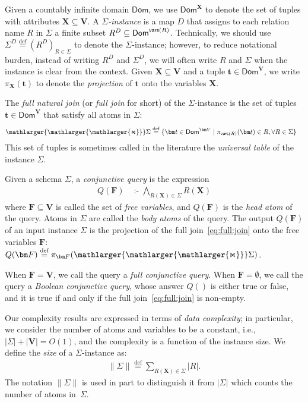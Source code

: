 \documentclass{theoretics}
\newcommand{\norm}[1]{\|#1\|}
\newcommand{\setof}[2]{\{{#1}\mid{#2}\}}        %
\newcommand{\dom}{\textsf{Dom}}
\newcommand{\defeq}{\stackrel{\text{def}}{=}}
\newcommand{\cd}{\text{ :- }}
\newcommand{\bigjoin}{\mathlarger{\mathlarger{\mathlarger{\Join}}}}
\newcommand{\vars}{\text{\sf vars}}
\begin{document}
Given a countably infinite domain $\dom$, we use $\dom^{\bm X}$ to denote the set of tuples
with attributes $\bm X \subseteq \bm V$. A {\em $\Sigma$-instance} is a map $D$ that assigns
to each relation name $R$ in $\Sigma$ a finite subset $R^D \subseteq\dom^{\vars(R)}$.
Technically, we should use $\Sigma^D \defeq (R^D)_{R \in \Sigma}$ to denote the
$\Sigma$-instance; however, to reduce notational burden, instead of writing $R^D$ and
$\Sigma^D$, we will often write $R$ and $\Sigma$ when the instance is clear from the context.
Given $\bm X \subseteq \bm V$ and a tuple $\bm t \in \dom^{\bm V}$, we write $\pi_{\bm
X}(\bm t)$ to denote the {\em projection} of $\bm t$ onto the variables $\bm X$.

The {\em full natural join} (or {\em full join} for short) of the $\Sigma$-instance is the set of tuples
$\bm t \in \dom^{\bm V}$ that satisfy all atoms in $\Sigma$:
%
\begin{align}
  \bigjoin \Sigma & \defeq \setof{\bm t \in \dom^{\bm V}}{
    \pi_{\vars(R)}(\bm t) \in R,
    \forall R \in \Sigma
  }
  \label{eq:full:join}
\end{align}
%
This set of tuples is sometimes called in the literature the {\em universal table} of the
instance $\Sigma$.

Given a schema $\Sigma$,  a {\em conjunctive query} is the expression
%
\begin{align}
    Q(\bm F) &\cd  \bigwedge_{R(\bm X)\in \Sigma} R(\bm X) \label{eq:cq}
\end{align}
where $\bm F \subseteq \bm V$ is called the set of {\em free variables},
and $Q(\bm F)$ is the {\em head atom} of the query.
Atoms in $\Sigma$ are called the {\em body atoms} of the query.
The output $Q(\bm F)$ of an input instance $\Sigma$ is the projection of the
full join~\eqref{eq:full:join} onto the free variables $\bm F$:
$Q(\bm F) \defeq \pi_{\bm F}(\bigjoin \Sigma)$.

When $\bm F = \bm V$, we call the query a {\em full conjunctive query}.
When $\bm F = \emptyset$, we call the query a {\em Boolean conjunctive query}, whose answer
$Q()$ is either {\sf true} or {\sf false}, and it is true if and only if the full
join~\eqref{eq:full:join} is non-empty.

Our complexity results are expressed in terms of
{\em data complexity}; in particular, we consider the number of atoms and variables to be a constant, i.e.,~$|\Sigma| + |\bm V| = O(1)$,
and the complexity is a function of the instance size. We
define the {\em size} of a $\Sigma$-instance as:
\begin{align}
    \norm{\Sigma}\defeq \sum_{R(\bm X) \in \Sigma} |R|.
    \label{eqn:input:size}
\end{align}
The notation $\norm{\Sigma}$ is used in part to distinguish it from $|\Sigma|$ which
counts the number of atoms in~$\Sigma$.
\end{document}
